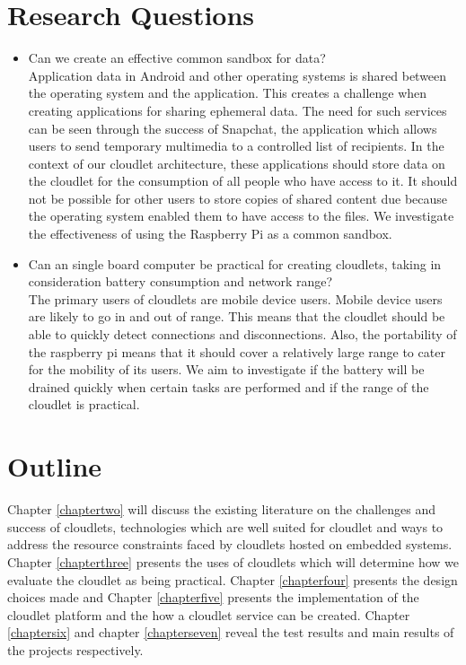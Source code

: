 \section{Research Questions}

\begin{itemize}
\item Can we create an effective common sandbox for data?\\

Application data in Android and other operating systems is shared between the operating system and the application. This creates a challenge when creating applications for sharing ephemeral data. The need for such services can be seen
through the success of Snapchat, the application which allows users to send temporary multimedia to a controlled list of recipients. In the context of our cloudlet architecture, these applications should store data on the cloudlet for the consumption of all people who have access to it. It should not be possible for other users to store copies of shared content due because the operating system enabled them to have access to the files. We investigate the effectiveness of using the Raspberry Pi as a common sandbox.

\item Can an single board computer be practical for creating cloudlets, taking in consideration battery consumption and network range?\\

The primary users of cloudlets are mobile device users. Mobile device users are likely to go in and out of range. This means that the cloudlet
should be able to quickly detect connections and disconnections. Also, the portability of the raspberry pi means that it should cover a relatively large range to cater for the mobility of its users. We aim to investigate if the battery will be drained quickly when certain tasks are performed and if the range of the cloudlet is practical.
\end{itemize}

\section{Outline}
Chapter \ref{chaptertwo} will discuss the existing literature on the challenges and success of cloudlets, technologies which are well suited for cloudlet and ways to address the resource constraints faced by cloudlets hosted on embedded systems. Chapter \ref{chapterthree} presents the uses of cloudlets which will determine how we evaluate the cloudlet as being practical. Chapter \ref{chapterfour} presents the design choices made and Chapter \ref{chapterfive} presents the implementation of the cloudlet platform and the how a cloudlet service can be created. Chapter \ref{chaptersix} and chapter \ref{chapterseven} reveal the test results and main results of the projects respectively.